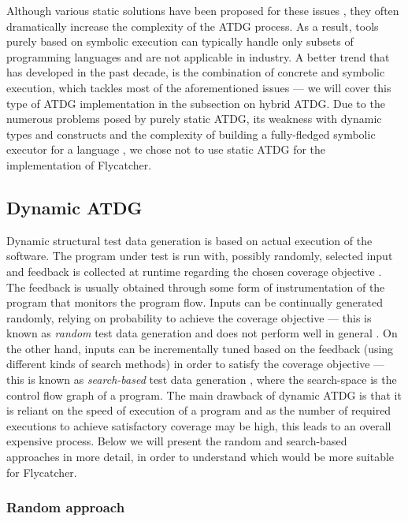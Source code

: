 \documentclass[a4paper,11pt,titlepage]{report}
\begin{document}
Although various static solutions have been proposed for these issues \cite{ramamoorthy1976automated,goldberg1994applications,offutt1999dynamic}, they often dramatically increase the complexity of the ATDG process. As a result, tools purely based on symbolic execution can typically handle only subsets of programming languages and are not applicable in industry. A better trend that has developed in the past decade, is the combination of concrete and symbolic execution, which tackles most of the aforementioned issues \cite{păsăreanu2009survey} --- we will cover this type of ATDG implementation in the subsection on hybrid ATDG. Due to the numerous problems posed by purely static ATDG, its weakness with dynamic types and constructs \cite{edvardsson1999survey,tahbildar2automated} and the complexity of building a fully-fledged symbolic executor for a language \cite{edvardsson1999survey,han2008empirical}, we chose not to use static ATDG for the implementation of Flycatcher.

\subsection{Dynamic ATDG}

Dynamic structural test data generation is based on actual execution of the software. The program under test is run with, possibly randomly, selected input and feedback is collected at runtime regarding the chosen coverage objective \cite{edvardsson1999survey}. The feedback is usually obtained through some form of instrumentation of the program that monitors the program flow. Inputs can be continually generated randomly, relying on probability to achieve the coverage objective --- this is known as \emph{random} test data generation and does not perform well in general \cite{edvardsson1999survey}. On the other hand, inputs can be incrementally tuned based on the feedback (using different kinds of search methods) in order to satisfy the coverage objective --- this is known as \emph{search-based} test data generation \cite{mcminn2004search}, where the search-space is the control flow graph of a program. The main drawback of dynamic ATDG is that it is reliant on the speed of execution of a program and as the number of required executions to achieve satisfactory coverage may be high, this leads to an overall expensive process. Below we will present the random and search-based approaches in more detail, in order to understand which would be more suitable for Flycatcher.

\subsubsection{Random approach}
\end{document}
